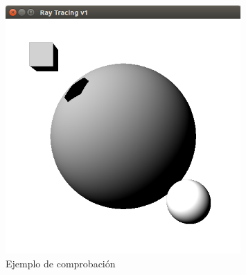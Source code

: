 \begin{figure}
	\begin{center}
		\includegraphics[width=0.8\textwidth]{imagenes/prueba.png}
	\end{center}
	\caption{Ejemplo de comprobación}
	\label{fig:etiq_9}
\end{figure}

